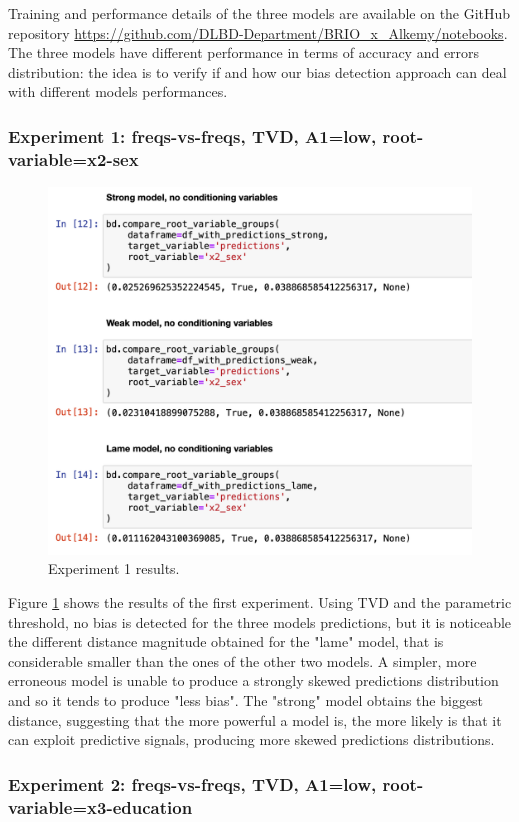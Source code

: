 \documentclass[
]{ceurart}
\begin{document}
Training and performance details of the three models are available on the GitHub repository \url{https://github.com/DLBD-Department/BRIO_x_Alkemy/notebooks}. The three models have different performance in terms of accuracy and errors distribution: the idea is to verify if and how our bias detection approach can deal with different models performances. 

\subsubsection{Experiment 1: freqs-vs-freqs, TVD, A1=low, root-variable=x2-sex}

\begin{figure}[h!]
  \includegraphics[width=.7\linewidth, left]{exp1.png}
  \caption{Experiment 1 results.}
  \label{fig:exp1}
\end{figure}
Figure \ref{fig:exp1} shows the results of the first experiment. Using TVD and the parametric threshold, no bias is detected for the three models predictions, but it is noticeable the different distance magnitude obtained for the "lame" model, that is considerable smaller than the ones of the other two models. A simpler, more erroneous model is unable to produce a strongly skewed predictions distribution and so it tends to produce "less bias". The "strong" model obtains the biggest distance, suggesting that the more powerful a model is, the more likely is that it can exploit predictive signals, producing more skewed predictions distributions. 

\subsubsection{Experiment 2: freqs-vs-freqs, TVD, A1=low, root-variable=x3-education}
\end{document}
